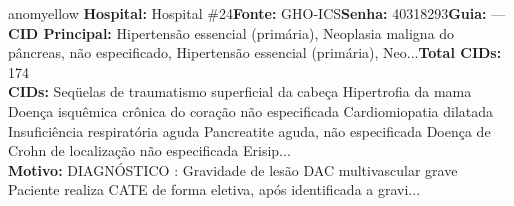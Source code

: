 \documentclass[a4paper,10pt]{article}
\begin{document}
\begin{anomalycard}[Interna\c{c}\~{a}o \#402 | Pac. \#474 | MODERADO (z=2.87) | LOS: 3d | 02/03/2026\,$\to$\,05/03/2026]{anomyellow}
\textbf{Hospital:} Hospital \#24\quad \textbf{Fonte:} GHO-ICS\quad \textbf{Senha:} 40318293\quad \textbf{Guia:} ---\\

\textbf{CID Principal:} {\small Hipertensão essencial (primária), Neoplasia maligna do pâncreas, não especificado, Hipertensão essencial (primária), Neo...}\quad\textbf{Total CIDs:} 174\\

\textbf{CIDs:} {\scriptsize Seqüelas de traumatismo superficial da cabeça \textbar{} Hipertrofia da mama \textbar{} Doença isquêmica crônica do coração não especificada \textbar{} Cardiomiopatia dilatada \textbar{} Insuficiência respiratória aguda \textbar{} Pancreatite aguda, não especificada \textbar{} Doença de Crohn de localização não especificada \textbar{} Erisip...}\\

\textbf{Motivo:} {\scriptsize DIAGNÓSTICO :  Gravidade de lesão   DAC multivascular grave   Paciente realiza CATE de forma eletiva, após identificada a gravi...}\\

\end{anomalycard}
\end{document}
